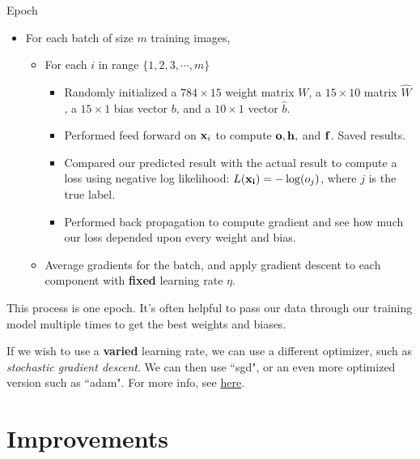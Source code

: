 \documentclass[xcolor=dvipsnames, fontsize=11pt, %
pagesize, %
parskip=half-, t]{beamer}
\begin{document}
\begin{frame}{Epoch}
\begin{itemize}
\item For each batch of size $m$ training images,
\begin{itemize}
\item For each $i$ in range $\{1, 2, 3, \cdots, m\}$ \pause 
\begin{itemize}
\item Randomly initialized a $784\times 15$ weight matrix $W$, a $15\times 10$ matrix $\hat{W}$, a $15\times 1$ bias vector $b$, and a $10\times 1$ vector $\hat{b}$.
\item Performed feed forward on $\bold{x}_i$ to compute $\bold{o}, \bold{h},$ and $\bold{f}$. Saved results. \pause 
\item Compared our predicted result with the actual result to compute a loss using negative log likelihood: $L(\bold{x_i})=-\log(o_j)$, where $j$ is the true label. \pause 
\item Performed back propagation to compute gradient and see how much our loss depended upon every weight and bias.  \pause 
\end{itemize}
\item Average gradients for the batch, and apply gradient descent to each component with \textbf{fixed} learning rate $\eta$. 
\end{itemize}
\end{itemize}
This process is one epoch. It's often helpful to pass our data through our training model multiple times to get the best weights and biases.  \pause

\vspace{0.025\textheight} 
If we wish to use a \textbf{varied} learning rate, we can use a different optimizer, such as \textit{stochastic gradient descent}. We can then use ``sgd", or an even more optimized version such as ``adam". For more info, see \href{https://en.wikipedia.org/wiki/Stochastic_gradient_descent\#Adam}{here}.
\end{frame}

\section{Improvements}
\end{document}
